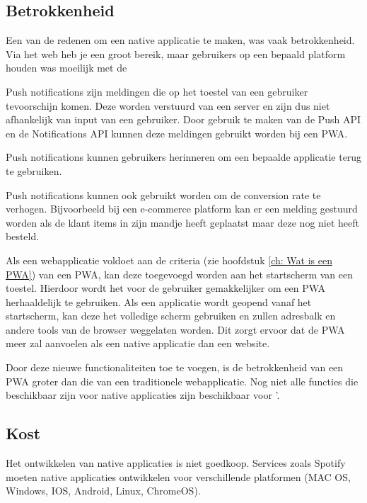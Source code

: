 	
\subsection{Betrokkenheid}
	Een van de redenen om een native applicatie te maken, was vaak betrokkenheid. Via het web heb je een groot bereik, maar gebruikers op een bepaald platform houden was moeilijk met de
	
	\autocite{Google2019}


	
	Push notifications zijn meldingen die op het toestel van een gebruiker tevoorschijn komen. Deze worden verstuurd van een server en zijn dus niet afhankelijk van input van een gebruiker. Door gebruik te maken van de Push API en de Notifications API kunnen deze meldingen gebruikt worden bij een PWA.
	
	Push notifications kunnen gebruikers herinneren om een bepaalde applicatie terug te gebruiken. 
	
	Push notifications kunnen ook gebruikt worden om de conversion rate te verhogen. Bijvoorbeeld bij een e-commerce platform kan er een melding gestuurd worden als de klant items in zijn mandje heeft geplaatst maar deze nog niet heeft besteld.
	
	\autocite{Gaunt2020}
	\autocite{Hiltunen2018}

	
	Als een webapplicatie voldoet aan de criteria (zie hoofdstuk \ref{ch: Wat is een PWA}) van een PWA, kan deze toegevoegd worden aan het startscherm van een toestel. Hierdoor wordt het voor de gebruiker gemakkelijker om een PWA herhaaldelijk te gebruiken. Als een applicatie wordt geopend vanaf het startscherm, kan deze het volledige scherm gebruiken en zullen adresbalk en andere tools van de browser weggelaten worden. Dit zorgt ervoor dat de PWA meer zal aanvoelen als een native applicatie dan een website.
	
	Door deze nieuwe functionaliteiten toe te voegen, is de betrokkenheid van een PWA groter dan die van een traditionele webapplicatie. Nog niet alle functies die beschikbaar zijn voor native applicaties zijn beschikbaar voor '.
	

\subsection{Kost}
	Het ontwikkelen van native applicaties is niet goedkoop. Services zoals Spotify moeten native applicaties ontwikkelen voor verschillende platformen (MAC OS, Windows, IOS, Android, Linux, ChromeOS).
	
